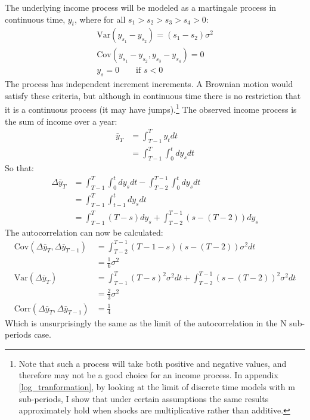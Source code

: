 The underlying income process will be modeled as a martingale process in continuous time, $y_t$, where for all  $s_1>s_2>s_3>s_4>0$:
\begin{align*}
\mathrm{Var}(y_{s_1}-y_{s_2})=(s_1-s_2)\sigma^2 \\
\mathrm{Cov}(y_{s_1}-y_{s_2},y_{s_3}-y_{s_4}) = 0 \\
y_s = 0 \qquad \text{if } s<0
\end{align*}
The process has independent increment increments. A Brownian motion would satisfy these criteria, but although in continuous time there is no restriction that it is a continuous process (it may have jumps).\footnote{Note that such a process will take both positive and negative values, and therefore may not be a good choice for an income process. In appendix \ref{log_tranformation}, by looking at the limit of discrete time models with m sub-periods, I show that under certain assumptions the same results approximately hold when shocks are multiplicative rather than additive.} The observed income process is the sum of income over a year:
\begin{align*}
\bar{y}_T &= \int_{T-1}^{T} y_t dt \\
&= \int_{T-1}^{T} \int_{0}^{t} dy_s dt 
\end{align*}
So that:
\begin{align*}
\Delta \bar{y}_T &= \int_{T-1}^{T} \int_{0}^{t} dy_s dt - \int_{T-2}^{T-1} \int_{0}^{t} dy_s dt \\
&= \int_{T-1}^{T} \int_{t-1}^{t} dy_s dt \\
&= \int_{T-1}^{T} (T-s) dy_s + \int_{T-2}^{T-1} (s-(T-2)) dy_s 
\end{align*}
The autocorrelation can now be calculated:
\begin{align*}
\mathrm{Cov}(\Delta \bar{y}_T,\Delta \bar{y}_{T-1}) &=  \int_{T-2}^{T-1} (T-1-s)(s-(T-2)) \sigma^2 dt \\
&= \frac{1}{6}\sigma^2 \\
\mathrm{Var}(\Delta \bar{y}_T) &= \int_{T-1}^{T} (T-s)^2 \sigma^2 dt + \int_{T-2}^{T-1} (s-(T-2))^2 \sigma^2 dt \\
&= \frac{2}{3}\sigma^2 \\
\mathrm{Corr}(\Delta \bar{y}_T,\Delta \bar{y}_{T-1}) &= \frac{1}{4}
\end{align*}
Which is unsurprisingly the same as the limit of the autocorrelation in the N sub-periods case.
